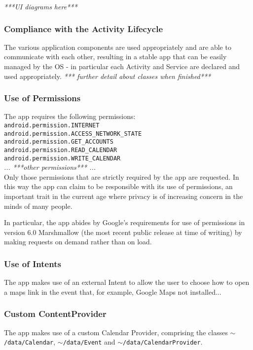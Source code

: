 \documentclass{article}
\def\code#1{\texttt{#1}} %
\begin{document}
\emph{***UI diagrams here***}

\subsubsection{Compliance with the Activity Lifecycle}
The various application components are used appropriately and are able to communicate with each other, resulting in a stable app that can be easily managed by the OS - in particular each Activity and Service are declared and used appropriately. \emph{*** further detail about classes when finished*** }
\subsubsection{Use of Permissions}
The app requires the following permissions:\\
    \newline
    \indent \code{android.permission.INTERNET}\\
    \indent \code{android.permission.ACCESS\_NETWORK\_STATE}\\
    \indent \code{android.permission.GET\_ACCOUNTS}\\
    \indent \code{android.permission.READ\_CALENDAR}\\
    \indent \code{android.permission.WRITE\_CALENDAR}\\
    \indent \emph{... ***other permissions*** ...}\\
    \newline
Only those permissions that are strictly required by the app are requested. In this way the app can claim to be responsible with its use of permissions, an important trait in the current age where privacy is of increasing concern in the minds of many people. 

In particular, the app abides by Google's requirements for use of permissions in version 6.0 Marshmallow (the most recent public release at time of writing) by making requests on demand rather than on load.

\subsubsection{Use of Intents}
The app makes use of an external Intent to allow the user to choose how to open a maps link in the event that, for example, Google Maps not installed...
\subsubsection{Custom ContentProvider}
The app makes use of a custom Calendar Provider, comprising the classes \code{$\mathtt{\sim}$/data/Calendar}, \code{$\mathtt{\sim}$/data/Event} and \code{$\mathtt{\sim}$/data/CalendarProvider}.
\end{document}
